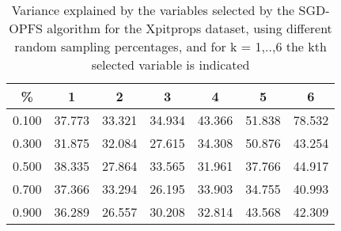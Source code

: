 \begin{table}
	\begin{center}
		\begin{tabular}{c c c c c c c}
			\% & 1 & 2 & 3 & 4 & 5 & 6 \\
			\hline
			0.100 & 37.773 & 33.321 & 34.934 & 43.366 & 51.838 & 78.532 \\
			0.300 & 31.875 & 32.084 & 27.615 & 34.308 & 50.876 & 43.254 \\
			0.500 & 38.335 & 27.864 & 33.565 & 31.961 & 37.766 & 44.917 \\
			0.700 & 37.366 & 33.294 & 26.195 & 33.903 & 34.755 & 40.993 \\
			0.900 & 36.289 & 26.557 & 30.208 & 32.814 & 43.568 & 42.309 \\
		\end{tabular}
	\end{center}
	\caption{Variance explained by the variables selected by the SGD-OPFS algorithm for the Xpitprops dataset, using different random sampling percentages, and for k = 1,..,6 the kth selected variable is indicated}
\end{table}